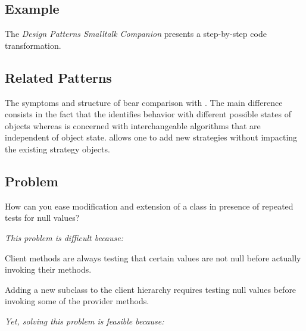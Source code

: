 \documentclass[a4paper,10pt,twoside]{book}
\begin{document}
\subsection*{Example}

The \emph{Design Patterns Smalltalk Companion} \cite{Alpe98a} presents a step-by-step code transformation.

\subsection*{Related Patterns}

The symptoms and structure of  bear comparison with . The main difference consists in the fact that the  identifies behavior with different possible states of objects whereas  is concerned with interchangeable algorithms that are independent of object state.  allows one to add new strategies without impacting the existing strategy objects. 




\subsection*{Problem}

How can you ease modification and extension of a class in presence of repeated tests for null values? 

\emph{This problem is difficult because:}

\begin{bulletlist}
\item Client methods are always testing that certain values are not null before actually invoking their methods.

\item Adding a new subclass to the client hierarchy requires testing null values before invoking some of the provider methods.
\end{bulletlist}

\emph{Yet, solving this problem is feasible because:}
\end{document}
